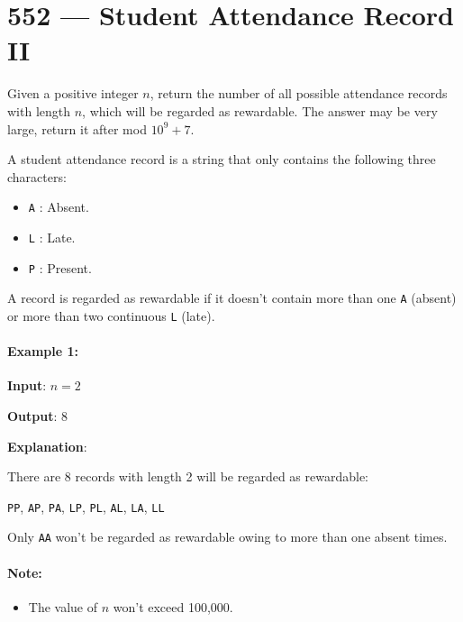 \section{552 --- Student Attendance Record II}
Given a positive integer $n$, return the number of all possible attendance records with length $n$, which will be regarded as rewardable. The answer may be very large, return it after mod $10^9 + 7$.

A student attendance record is a string that only contains the following three characters:

\begin{itemize}
\item \texttt{A} : Absent.
\item \texttt{L} : Late.
\item \texttt{P} : Present.
\end{itemize}

A record is regarded as rewardable if it doesn't contain more than one \texttt{A} (absent) or more than two continuous \texttt{L} (late).

\paragraph{Example 1:}

\begin{flushleft}
\textbf{Input}: $n = 2$

\textbf{Output}: 8 

\textbf{Explanation}:

There are 8 records with length 2 will be regarded as rewardable:

\texttt{PP}, \texttt{AP}, \texttt{PA}, \texttt{LP}, \texttt{PL}, \texttt{AL}, \texttt{LA}, \texttt{LL}

Only \texttt{AA} won't be regarded as rewardable owing to more than one absent times. 
\end{flushleft}

\paragraph{Note:} 
\begin{itemize}
\item The value of $n$ won't exceed 100,000.
\end{itemize}

